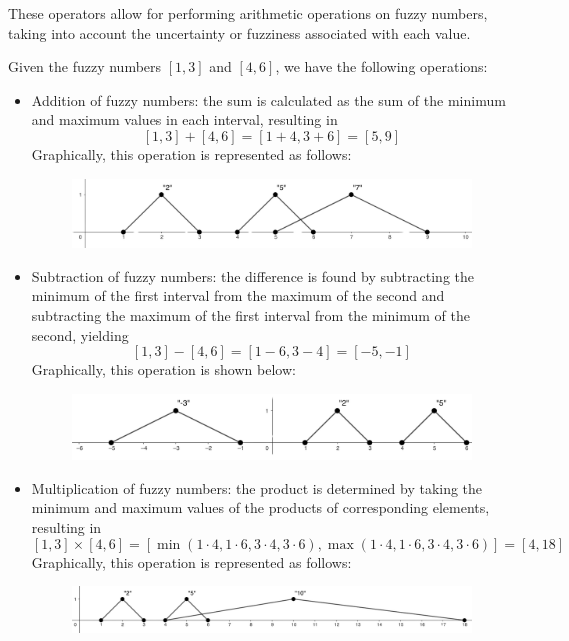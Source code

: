 These operators allow for performing arithmetic operations on fuzzy numbers, taking into account the uncertainty or fuzziness associated with each value.
\begin{example}
    Given the fuzzy numbers $[1,3]$ and $[4,6]$, we have the following operations:
    \begin{itemize}
        \item Addition of fuzzy numbers: the sum is calculated as the sum of the minimum and maximum values in each interval, resulting in 
        \[[1,3] + [4,6] = [1+4, 3+6] = [5,9]\]
        Graphically, this operation is represented as follows:
            \begin{figure}[H]
                \centering
                \includegraphics[width=0.75\linewidth]{images/sum.png}
            \end{figure}
        \item Subtraction of fuzzy numbers: the difference is found by subtracting the minimum of the first interval from the maximum of the second and subtracting the maximum of the first interval from the minimum of the second, yielding 
        \[[1,3] - [4,6] = [1-6, 3-4] = [-5,-1]\]
        Graphically, this operation is shown below:
            \begin{figure}[H]
                \centering
                \includegraphics[width=0.75\linewidth]{images/subtraction.png}
            \end{figure}
        \item Multiplication of fuzzy numbers: the product is determined by taking the minimum and maximum values of the products of corresponding elements, resulting in 
        \[[1,3] \times [4,6] = [\min(1 \cdot 4, 1 \cdot 6, 3 \cdot 4, 3 \cdot 6), \max(1 \cdot 4, 1 \cdot 6, 3 \cdot 4, 3 \cdot 6)] = [4,18]\]
        Graphically, this operation is represented as follows:
            \begin{figure}[H]
                \centering
                \includegraphics[width=0.75\linewidth]{images/multiplication.png}

\end{figure}
\end{itemize}
\end{example}
